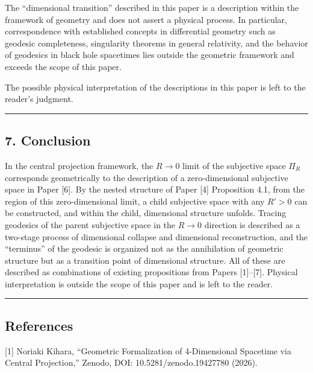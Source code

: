 \documentclass[a4paper,11pt]{article}
\theoremstyle{definition}
\begin{document}
The ``dimensional transition'' described in this paper is a description
within the framework of geometry and does not assert a physical process.
In particular, correspondence with established concepts in differential
geometry such as geodesic completeness, singularity theorems in general
relativity, and the behavior of geodesics in black hole spacetimes lies
outside the geometric framework and exceeds the scope of this paper.

The possible physical interpretation of the descriptions in this paper
is left to the reader's judgment.

\begin{center}\rule{0.5\linewidth}{0.5pt}\end{center}

\subsection{7. Conclusion}\label{conclusion}

In the central projection framework, the \(R \to 0\) limit of the
subjective space \(\Pi_R\) corresponds geometrically to the description
of a zero-dimensional subjective space in Paper {[}6{]}. By the nested
structure of Paper {[}4{]} Proposition 4.1, from the region of this
zero-dimensional limit, a child subjective space with any \(R' > 0\) can
be constructed, and within the child, dimensional structure unfolds.
Tracing geodesics of the parent subjective space in the \(R \to 0\)
direction is described as a two-stage process of dimensional collapse
and dimensional reconstruction, and the ``terminus'' of the geodesic is
organized not as the annihilation of geometric structure but as a
transition point of dimensional structure. All of these are described as
combinations of existing propositions from Papers {[}1{]}--{[}7{]}.
Physical interpretation is outside the scope of this paper and is left
to the reader.

\begin{center}\rule{0.5\linewidth}{0.5pt}\end{center}

\subsection{References}\label{references}

{[}1{]} Noriaki Kihara, ``Geometric Formalization of 4-Dimensional
Spacetime via Central Projection,'' Zenodo, DOI: 10.5281/zenodo.19427780
(2026).
\end{document}
